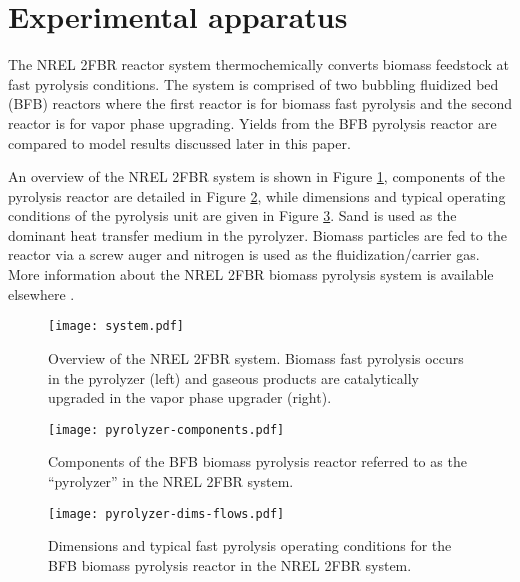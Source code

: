 
\section{Experimental apparatus}

The NREL 2FBR reactor system thermochemically converts biomass feedstock at fast pyrolysis conditions. The system is comprised of two bubbling fluidized bed (BFB) reactors where the first reactor is for biomass fast pyrolysis and the second reactor is for vapor phase upgrading. Yields from the BFB pyrolysis reactor are compared to model results discussed later in this paper.

An overview of the NREL 2FBR system is shown in Figure \ref{fig:nrel-system}, components of the pyrolysis reactor are detailed in Figure \ref{fig:pyrolyzer-components}, while dimensions and typical operating conditions of the pyrolysis unit are given in Figure \ref{fig:pyrolyzer-dims-flows}. Sand is used as the dominant heat transfer medium in the pyrolyzer. Biomass particles are fed to the reactor via a screw auger and nitrogen is used as the fluidization/carrier gas. More information about the NREL 2FBR biomass pyrolysis system is available elsewhere \cite{Howe-2015, Trendewicz-2015}.

\begin{figure}[H]
    \centering
    \texttt{[image: system.pdf]}
    \caption{Overview of the NREL 2FBR system. Biomass fast pyrolysis occurs in the pyrolyzer (left) and gaseous products are catalytically upgraded in the vapor phase upgrader (right).}
    \label{fig:nrel-system}
\end{figure}

\begin{figure}[H]
    \centering
    \texttt{[image: pyrolyzer-components.pdf]}
    \caption{Components of the BFB biomass pyrolysis reactor referred to as the ``pyrolyzer'' in the NREL 2FBR system.}
    \label{fig:pyrolyzer-components}
\end{figure}

\begin{figure}[H]
    \centering
    \texttt{[image: pyrolyzer-dims-flows.pdf]}
    \caption{Dimensions and typical fast pyrolysis operating conditions for the BFB biomass pyrolysis reactor in the NREL 2FBR system.}
    \label{fig:pyrolyzer-dims-flows}
\end{figure}

